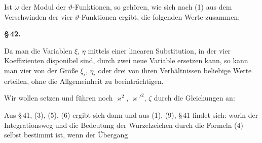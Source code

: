 
Ist \(\omega\) der Modul der \(\vartheta\)-Funktionen, so gehören, wie sich nach (1) aus
dem Verschwinden der vier \(\vartheta\)-Funktionen ergibt, die folgenden Werte
zusammen:

\begin{center}
\textbf{\S\,42. }
\end{center}

Da man die Variablen \(\xi\), \(\eta\) mittels einer linearen Substitution, in der
vier Koeffizienten disponibel sind, durch zwei neue Variable ersetzen
kann, so kann man vier von der Größe \(\xi_i\), \(\eta_i\) oder drei von ihren
Verhältnissen beliebige Werte erteilen, ohne die Allgemeinheit zu
beeinträchtigen.

Wir wollen setzen
und führen noch \(\varkappa^2\), \(\varkappa'^2\), \(\zeta\) durch die Gleichungen an:

Aus \S\,41, (3), (5), (6) ergibt sich dann
und aus (1), (9), \S\,41 findet sich:
worin der Integrationsweg und die Bedeutung der Wurzelzeichen durch
die Formeln (4) selbst bestimmt ist, wenn der Übergang

